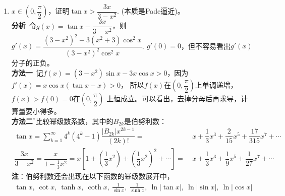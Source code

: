 \begin{enumerate}[label={【\textbf{例\thechapter.\arabic*}】},
 leftmargin=\inteval{\myenumleftmargin}pt,
 itemsep=\inteval{\myenumitempsep}pt,
 itemindent=\inteval{\myenumitemindent}pt]
\item $ x\in(0,\dfrac{\pi}{2}) $，证明$ \tan x>\dfrac{3x}{3-x^2} $.
(本质是Pade逼近)。 \\
\textbf{分析}\ 令$ g(x)=\tan x-\dfrac{3x}{3-x^2} $，则$ g'(x)=\dfrac{(3-x^2)^2-3(x^2+3)
    \cos^2 x}{(3-x^2)^2\cos^2 x},\ g'(0)=0 $，但不容易看出$ g'(x) $分子的正负。\\
\textbf{方法一}\ 记$ f(x)= (3-x^2)\sin x-3x\cos x>0 $，因为$ f'(x)=x\cos x(\tan x-x)>0 $，
所以$ f(x) $在$ (0,\dfrac{\pi}{2}) $上单调递增，$ f(x)>f(0)=0 $在$ (0,\dfrac{\pi}{2}) $
上恒成立。可以看出，去掉分母后再求导，计算量要小得多。\\
\textbf{方法二}$ ^* $比较幂级数系数，其中的$ B_{2k} $是伯努利数：
\begin{align*}
    \tan x =\sum_{k=1}^{\infty}4^k(4^k-1)\dfrac{|B_{2k}|x^{2k-1}}{(2k)!} =&\ 
    x+\dfrac{1}{3}x^3+\dfrac{2}{15}x^5+\dfrac{17}{315}x^7+\cdots  \\
    \dfrac{3x}{3-x^2} =\dfrac{x}{1-\frac{1}{3}x^2}=x\left[1+
    \left(\dfrac{1}{3}x^2\right)+\left(\dfrac{1}{3}x^2\right)^2+\cdots  \right] 
    =&\ x+\dfrac{1}{3}x^3+\dfrac{1}{9}x^5+\dfrac{1}{27}x^7+\cdots 
\end{align*}
\textbf{注}：伯努利数还会出现在以下函数的幂级数展开中，
\begin{gather*}
    \tan x,\ \cot x,\ \tanh x,\ \coth x,\ \frac{1}{\sin x},
    \ \frac{1}{\sinh x},\ \ln|\tan x|,\ \ln|\sin x|,\ \ln|\cos x|
\end{gather*}


\end{enumerate}
